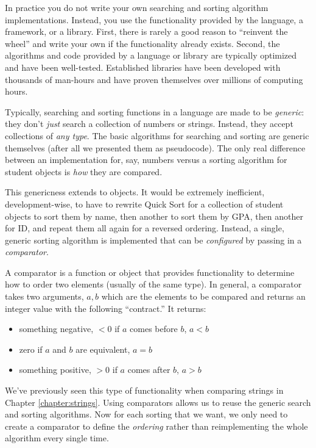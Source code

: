 In practice you do not write your own searching and sorting
algorithm implementations.  Instead, you use the functionality provided
by the language, a framework, or a library.  First, there is rarely a
good reason to ``reinvent the wheel'' and write your own if the functionality
already exists.  Second, the algorithms and code provided by a language
or library are typically optimized and have been well-tested.  Established
libraries have been developed with thousands of man-hours and have proven themselves over millions of computing hours.

Typically, searching and sorting functions in a language are made to
be \emph{generic}: they don't \emph{just} search a collection of numbers
or strings.  Instead, they accept collections of \emph{any type}.  The
basic algorithms for searching and sorting are generic themselves (after
all we presented them as pseudocode).  The only real difference between
an implementation for, say, numbers versus a sorting algorithm for 
student objects is \emph{how} they are compared.  

This genericness extends to objects.  It would be extremely inefficient, 
development-wise, to have to rewrite Quick Sort for a collection of 
student objects to sort them by name, then another to sort them by GPA, 
then another for ID, and repeat them all again for a reversed ordering.
Instead, a single, generic sorting algorithm is implemented that can
be \emph{configured} by passing in a \emph{comparator}.

A  comparator is a function or object that provides functionality to determine
how to order two elements (usually of the same type).  In general, a
comparator takes two arguments, $a, b$ which are the elements to be 
compared and returns an integer value with the following ``contract.''
It returns:
\begin{itemize}
  \item something negative, $< 0$ if $a$ comes before $b$, $a < b$
  \item zero if $a$ and $b$ are equivalent, $a = b$
  \item something positive, $> 0$ if $a$ comes after $b$, $a > b$
\end{itemize}
We've previously seen this type of functionality when comparing strings in
Chapter \ref{chapter:strings}.  Using comparators allows us to reuse
the generic search and sorting algorithms.  Now for each sorting that
we want, we only need to create a comparator to define the \emph{ordering}
rather than reimplementing the whole algorithm every single time.

